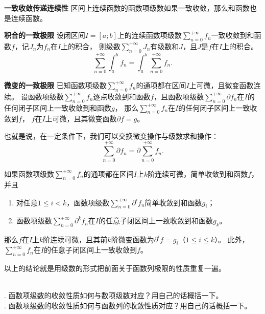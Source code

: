 \documentclass[12pt,UTF8,fontset=none]{ctexbook}
\begin{document}
\begin{tm}{\textbf{一致收敛传递连续性}}
    区间上连续函数的函数项级数如果一致收敛，那么和函数也是连续函数。
\end{tm}

\begin{tm}{\textbf{积合的一致极限}}
    设闭区间$I=[a;b]$上的连续函数项级数$\sum_{n=0}^{+\infty} f_n$一致收敛到和函数$f$，记$J_n$为$f_n$在$I$上的积合，
    则级数$\sum_{n=0}^{+\infty} J_n$有级数和$J$，且$J$是$f$在$I$上的积合。
    $$ \sum_{n=0}^{+\infty} \int_a^b f_n = \int_a^b \sum_{n=0}^{+\infty} f_n. $$
\end{tm}

\begin{tm}{\textbf{微变的一致极限}}
    已知函数项级数$\sum_{n=0}^{+\infty} f_n$的通项都在区间$I$上可微，且微变函数连续。
    设函数项级数$\sum_{n=0}^{+\infty} f_n$逐点收敛到和函数$f$，且函数项级数$\sum_{n=0}^{+\infty} \partial f_n$在$I$的任何闭子区间上一致收敛到和函数$g$，
    那么$\sum_{n=0}^{+\infty} f_n$在$I$的任何闭子区间上一致收敛到$f$，
    $f$在$I$上可微，且其微变函数$\partial f = g$。

    也就是说，在一定条件下，我们可以交换微变操作与级数求和操作：
    $$ \sum_{n=0}^{+\infty} \partial f_n = \partial \sum_{n=0}^{+\infty} f_n. $$
    
    如果函数项级数$\sum_{n=0}^{+\infty} f_n$的通项都在区间$I$上$k$阶连续可微，简单收敛到和函数$f$，并且
    \begin{enumerate}
        \item 对任意$1 \leqslant i < k$，函数项级数$\sum_{n=0}^{+\infty} \partial^i f_n$简单收敛到和函数$g_i$；
        \item 函数项级数$\sum_{n=0}^{+\infty} \partial^k f_n$在$I$的任意子闭区间上一致收敛到和函数$g_k$。
    \end{enumerate}
    那么$f$在$I$上$k$阶连续可微，且其前$k$阶微变函数为$\partial^i f = g_i$（$1 \leqslant i\leqslant k$）。
    此外，$\sum_{n=0}^{+\infty} f_n$在$I$的任意子闭区间上一致收敛到$f$。
\end{tm}

以上的结论就是用级数的形式把前面关于函数列极限的性质重复一遍。

\begin{sk}
    \mbox{} \\
    . 函数项级数的收敛性质如何与数项级数对应？用自己的话概括一下。\\
    . 函数项级数的收敛性质如何与函数列的收敛性质对应？用自己的话概括一下。
\end{sk}
\end{document}
